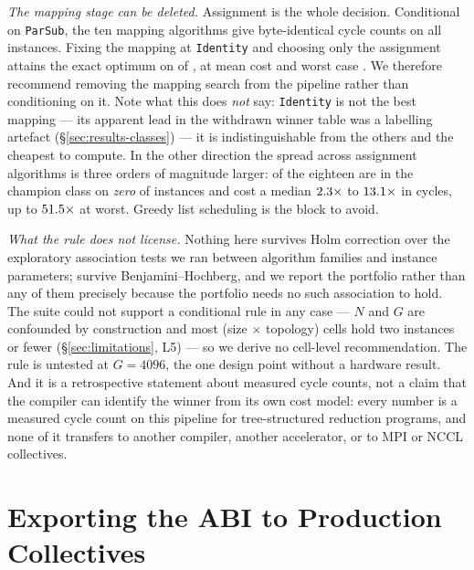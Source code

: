 \documentclass[journal,10pt]{IEEEtran}
\theoremstyle{plain}
\theoremstyle{definition}
\theoremstyle{remark}
\newcommand{\sv}[1]{\texttt{#1}}
\begin{document}
\emph{The mapping stage can be deleted.} Assignment is the whole decision.
Conditional on \sv{ParSub}, the ten mapping algorithms give byte-identical
cycle counts on all \TournNInst{} instances. Fixing the mapping at
\sv{Identity} and choosing only the assignment attains the exact optimum on
\SelIdentityOpt{} of \TournNInst{}, at mean cost \SelIdentityMean{} and worst
case \SelIdentityWorst{}. We therefore recommend removing the mapping search
from the pipeline rather than conditioning on it. Note what this does
\emph{not} say: \sv{Identity} is not the best mapping --- its apparent lead in
the withdrawn winner table was a labelling artefact
(\S\ref{sec:results-classes}) --- it is indistinguishable from the others and
the cheapest to compute. In the other direction the spread across assignment
algorithms is three orders of magnitude larger: \SelZeroCount{} of the
eighteen are in the champion class on \emph{zero} of \TournNInst{} instances
and cost a median $2.3\times$ to $13.1\times$ in
cycles, up to $51.5\times$ at worst. Greedy list scheduling is the
block to avoid.



\emph{What the rule does not license.} Nothing here survives Holm
correction over the \SelExpTests{} exploratory association tests we ran between
algorithm families and instance parameters; \SelBHSurvivors{} survive
Benjamini--Hochberg, and we report the portfolio rather than any of them
precisely because the portfolio needs no such association to hold. The suite
could not support a conditional rule in any case --- $N$ and $G$ are confounded
by construction and most (size $\times$ topology) cells hold two instances or
fewer (\S\ref{sec:limitations}, L5) --- so we derive no cell-level
recommendation. The rule is untested at $G = 4096$, the one design point
without a hardware result. And it is a retrospective statement about measured
cycle counts, not a claim that the compiler can identify the winner from its own
cost model: every number is a measured cycle count on this pipeline for
tree-structured reduction programs, and none of it transfers to another
compiler, another accelerator, or to MPI or NCCL collectives.



\section{Exporting the ABI to Production Collectives}\label{sec:pinfbt}
\end{document}
